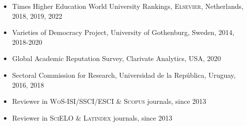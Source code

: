 





\begin{publications}

\begin{itemize}
\item{\small Times Higher Education World University Rankings, {\scshape Elsevier}, 
Netherlands, 2018, 2019, 2022}
\item{\small Varieties of Democracy Project, University of Gothenburg, Sweden, 2014, 2018-2020}
\item{\small Global Academic Reputation Survey, Clarivate Analytics, USA, 2020}
\item{\small Sectoral Commission for Research, Universidad de la Rep\'ublica, Uruguay, 2016, 2018}
\item{\small Reviewer in {\scshape WoS-ISI/SSCI/ESCI} \& {\scshape Scopus} journals, since 2013}
\item{\small Reviewer in {\scshape SciELO} \& {\scshape Latindex} journals, since 2013}
\end{itemize}

\end{publications}
\pagebreak
